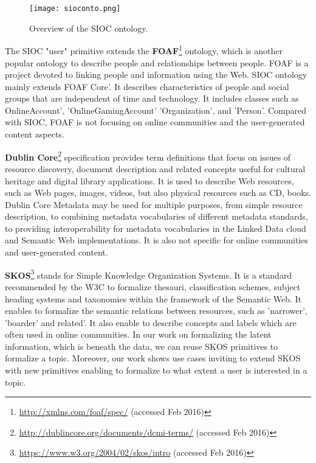 \begin{figure}%
\centering
\texttt{[image: sioconto.png]}  
\caption{Overview of the SIOC ontology.}
\label{fig:siocontos} 
\end{figure}

The SIOC "user" primitive extends the \textbf{FOAF}\footnote{\url{http://xmlns.com/foaf/spec/} (accessed Feb 2016)} ontology, which is another popular ontology to describe people and relationships between people. FOAF is a project devoted to linking people and information using the Web. SIOC ontology mainly extends FOAF Core'. It describes characteristics of people and social groups that are independent of time and technology. It includes classes such as OnlineAccount', 'OnlineGamingAccount' 'Organization', and 'Person'. Compared with SIOC, FOAF is not focusing on online communities and the user-generated content aspects. 
 
\textbf{Dublin Core}\footnote{\url{http://dublincore.org/documents/dcmi-terms/} (accessed Feb 2016)} specification provides term definitions that focus on issues of resource discovery, document description and related concepts useful for cultural heritage and digital library applications. It is used to describe Web resources, such as Web pages, images, videos, but also physical resources such as CD, books. Dublin Core Metadata may be used for multiple purposes, from simple resource description, to combining metadata vocabularies of different metadata standards, to providing interoperability for metadata vocabularies in the Linked Data cloud and Semantic Web implementations. It is also not specific for online communities and user-generated content.

\textbf{SKOS}\footnote{\url{https://www.w3.org/2004/02/skos/intro} (accessed Feb 2016)} stands for Simple Knowledge Organization Systems. It is a standard recommended by the W3C to formalize thesauri, classification schemes, subject heading systems and taxonomies within the framework of the Semantic Web. It enables to formalize the semantic relations between resources, such as 'narrower', 'boarder' and related'. It also enable to describe concepts and labels which are often used in online communities. 
In our work on formalizing the latent information, which is beneath the data, we can reuse SKOS primitives to formalize a topic. Moreover, our work shows use cases inviting to extend SKOS with new primitives enabling to formalize to what extent a user is interested in a topic.

 
